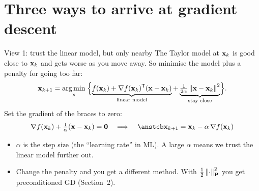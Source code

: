 \section{Three ways to arrive at gradient descent}

\begin{frame}{View 1: trust the linear model, but only nearby}
  The Taylor model at $\mathbf{x}_k$ is good close to $\mathbf{x}_k$ and gets worse as you move away. So minimise the model
  plus a penalty for going too far:
  \[
    \mathbf{x}_{k+1} = \operatorname*{arg\,min}_{\mathbf{x}}\;\Bigl\{\underbrace{f(\mathbf{x}_k) + \nabla f(\mathbf{x}_k)^{\mathsf T}(\mathbf{x} - \mathbf{x}_k)}_{\text{linear model}}
      + \underbrace{\tfrac{1}{2\alpha}\left\lVert \mathbf{x} - \mathbf{x}_k \right\rVert^2}_{\text{stay close}}\Bigr\}.
  \]
  Set the gradient of the braces to zero:
  \[
    \nabla f(\x_k) + \tfrac1\alpha(\x - \x_k) = \mathbf 0
    \quad\Longrightarrow\quad
    \ans{\x_{k+1} = \x_k - \alpha\,\nabla f(\x_k)}
  \]
  \begin{itemize}\small
    \item $\alpha$ is the \alert{step size} (the ``learning rate'' in ML). A large $\alpha$ means we trust the linear model further out.
    \item Change the penalty and you get a different method. With $\tfrac12\left\lVert \cdot \right\rVert_{\mathbf{P}}^2$ you get preconditioned GD (Section~2).
  \end{itemize}
\end{frame}

